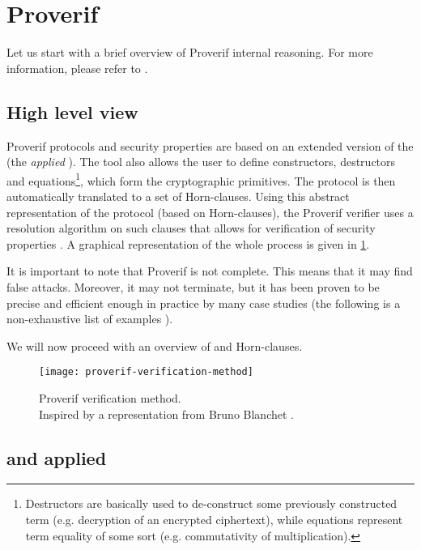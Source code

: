 
\section{Proverif}
Let us start with a brief overview of Proverif internal reasoning. For more information, please refer to \cite{SymbolicComputationalBlanchet, SymbolicVerificationBlanchet, ProverifManual}.

\subsection{High level view}
Proverif protocols and security properties are based on an extended version of the \pic (the \textit{applied} \pic). The tool also allows the user to define constructors, destructors and equations\footnote{Destructors are basically used to de-construct some previously constructed term (e.g. decryption of an encrypted ciphertext), while equations represent term equality of some sort (e.g. commutativity of multiplication).}, which form the cryptographic primitives. The protocol is then automatically translated to a set of Horn-clauses. Using this abstract representation of the protocol (based on Horn-clauses), the Proverif verifier uses a resolution algorithm on such clauses that allows for verification of security properties \cite{SymbolicComputationalBlanchet}.
A graphical representation of the whole process is given in \cref{fig:proverif-verification-method}.

It is important to note that Proverif is not complete. This means that it may find false attacks. Moreover, it may not terminate, but it has been proven to be precise and efficient enough in practice by many case studies (the following is a non-exhaustive list of examples \cite{10.1145/1266977.1266978, ABADI20053, hal-01575923, DBLP:journals/corr/abs-2012-03141}).

We will now proceed with an overview of \pic and Horn-clauses.

\begin{figure}[t]
    \texttt{[image: proverif-verification-method]}
    \centering
    \caption{Proverif verification method.\\Inspired by a representation from Bruno Blanchet \cite{SymbolicComputationalBlanchet}.}
    \label{fig:proverif-verification-method}
\end{figure}

\subsection{\pic and applied \pic}

